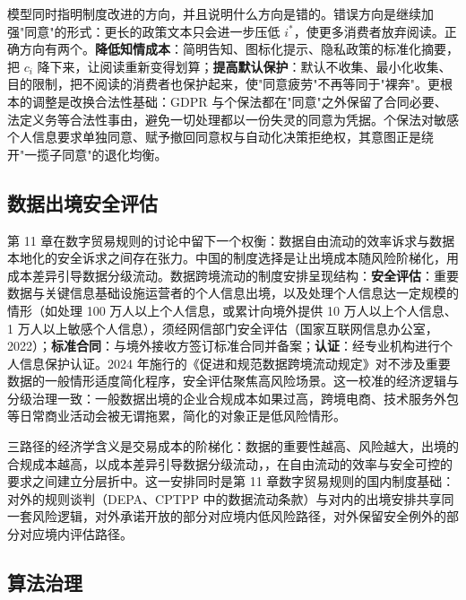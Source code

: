 模型同时指明制度改进的方向，并且说明什么方向是错的。错误方向是继续加强"同意"的形式：更长的政策文本只会进一步压低 $i^*$，使更多消费者放弃阅读。正确方向有两个。\textbf{降低知情成本}：简明告知、图标化提示、隐私政策的标准化摘要，把 $c_i$ 降下来，让阅读重新变得划算；\textbf{提高默认保护}：默认不收集、最小化收集、目的限制，把不阅读的消费者也保护起来，使"同意疲劳"不再等同于"裸奔"。更根本的调整是改换合法性基础：GDPR 与个保法都在"同意"之外保留了合同必要、法定义务等合法性事由，避免一切处理都以一份失灵的同意为凭据。个保法对敏感个人信息要求单独同意、赋予撤回同意权与自动化决策拒绝权，其意图正是绕开"一揽子同意"的退化均衡。

\subsection{数据出境安全评估}

第 11 章在数字贸易规则的讨论中留下一个权衡：数据自由流动的效率诉求与数据本地化的安全诉求之间存在张力。中国的制度选择是让出境成本随风险阶梯化，用成本差异引导数据分级流动。数据跨境流动的制度安排呈现结构：\textbf{安全评估}：重要数据与关键信息基础设施运营者的个人信息出境，以及处理个人信息达一定规模的情形（如处理 100 万人以上个人信息，或累计向境外提供 10 万人以上个人信息、1 万人以上敏感个人信息），须经网信部门安全评估（国家互联网信息办公室，2022）；\textbf{标准合同}：与境外接收方签订标准合同并备案；\textbf{认证}：经专业机构进行个人信息保护认证。2024 年施行的《促进和规范数据跨境流动规定》对不涉及重要数据的一般情形适度简化程序，安全评估聚焦高风险场景。这一校准的经济逻辑与分级治理一致：一般数据出境的企业合规成本如果过高，跨境电商、技术服务外包等日常商业活动会被无谓拖累，简化的对象正是低风险情形。

三路径的经济学含义是交易成本的阶梯化：数据的重要性越高、风险越大，出境的合规成本越高，以成本差异引导数据分级流动，，在自由流动的效率与安全可控的要求之间建立分层折中。这一安排同时是第 11 章数字贸易规则的国内制度基础：对外的规则谈判（DEPA、CPTPP 中的数据流动条款）与对内的出境安排共享同一套风险逻辑，对外承诺开放的部分对应境内低风险路径，对外保留安全例外的部分对应境内评估路径。

\subsection{算法治理}

